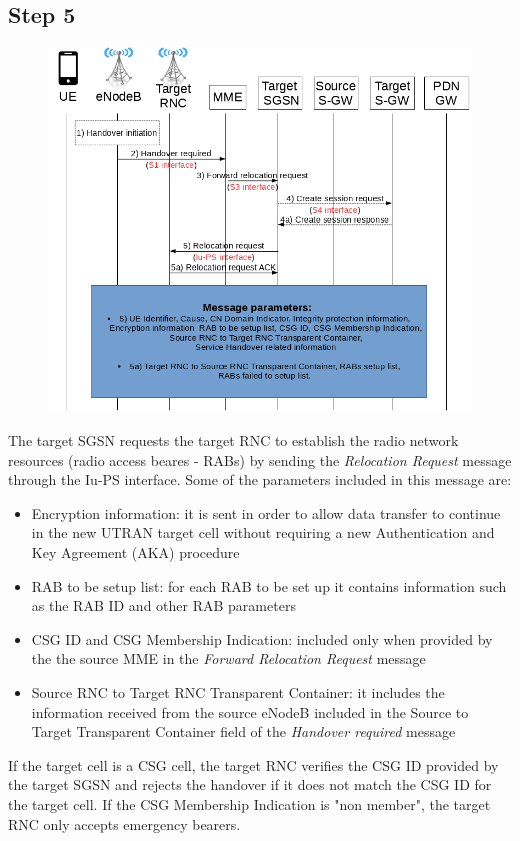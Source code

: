 \subsection*{Step 5}
\begin{figure}[!htb]
	\centering
	\includegraphics[width=0.9\linewidth]{img/5.png}
	\label{fig:5}
\end{figure}
The target SGSN requests the target RNC to establish the radio
network resources (radio access beares - RABs) by sending the
\emph{Relocation Request} message through the Iu-PS interface. Some of the
parameters included in this message are:
\begin{itemize}
	\item Encryption information: it is sent in order to allow data transfer to
	continue in the new UTRAN target cell without requiring a new Authentication
	and Key Agreement (AKA) procedure
	\item RAB to be setup list: for each RAB to be set up it contains information
	such as the RAB ID and other RAB parameters
	\item CSG ID and CSG Membership Indication: included only when provided by
	the the source MME in the \emph{Forward Relocation Request} message
	\item Source RNC to Target RNC Transparent Container: it includes the information
	received from the source eNodeB included in the Source to Target Transparent
	Container field of the \emph{Handover required} message
\end{itemize}
If the target cell is a CSG cell, the target RNC verifies the CSG ID provided
by the target SGSN and rejects the handover if it does not match the CSG ID for
the target cell. If the CSG Membership Indication is "non member", the target
RNC only accepts emergency bearers.



